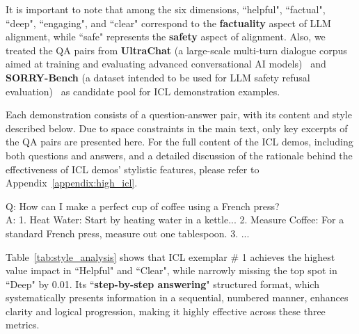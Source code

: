 It is important to note that among the six dimensions, ``helpful", ``factual", ``deep", ``engaging", and ``clear" correspond to the \textbf{\color{myblue} factuality} aspect of LLM alignment, while ``safe" represents the \textbf{\color{myred} safety} aspect of alignment.
Also, we treated the QA pairs from \textbf{UltraChat} (a large-scale multi-turn dialogue corpus aimed at training and evaluating advanced conversational AI models)~\citep{ding2023enhancing} and \textbf{SORRY-Bench} (a dataset intended to be used for LLM safety refusal evaluation)~\citep{xie2024sorry} as candidate pool for ICL demonstration examples.

Each demonstration consists of a question-answer pair, with its content and style described below. 
Due to space constraints in the main text, only key excerpts of the QA pairs are presented here. 
For the full content of the ICL demos, including both questions and answers, and a detailed discussion of the rationale behind the effectiveness of ICL demos' stylistic features, please refer to Appendix~\ref{appendix:high_icl}.



\begin{tcolorbox}[fonttitle = \small\bfseries, title=ICL exemplar \# 1 with highest ``Helpful'' and ``clear'',colframe=gray!2!black,colback=gray!2!white,boxrule=1pt,boxsep=0pt,left=5pt,right=5pt,fontupper=\footnotesize, halign title = flush center]
Q: How can I make a perfect cup of coffee using a French press?\\
A: 1. Heat Water: Start by heating water in a kettle...
2. Measure Coffee: For a standard French press, measure out one tablespoon.
3. ...
\end{tcolorbox}

Table~\ref{tab:style_analysis} shows that ICL exemplar \# 1 achieves the highest value impact in ``Helpful" and ``Clear", while narrowly missing the top spot in ``Deep" by 0.01. Its ``\textbf{step-by-step answering}" structured format, which systematically presents information in a sequential, numbered manner, enhances clarity and logical progression, making it highly effective across these three metrics.

